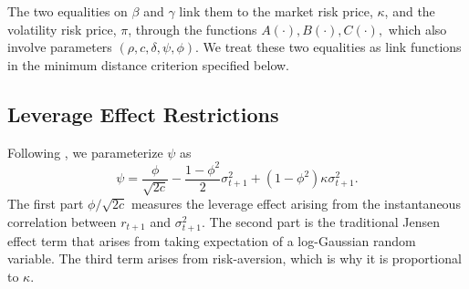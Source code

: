 \documentclass[11pt, letterpaper, twoside]{article}
\begin{document}
The two equalities on $\beta $ and $\gamma $ link them to the market risk price, $\kappa$, and the volatility risk price, $\pi$,  through the functions $A(\cdot),B(\cdot ),C(\cdot ),$ which also involve parameters $(\rho ,c,\delta ,\psi ,\phi ).$ We treat these two equalities as link functions in the minimum distance criterion specified below.

\subsection{Leverage Effect Restrictions}\label{sec:leverage effect restrict}



Following \textcite{han2018leverage}, we parameterize $\psi$ as 
%
\begin{equation}
    \label{eqn:leverage restriction}
    \psi = \frac{\phi}{\sqrt{2c}} - \frac{1 - \phi^2}{2} \sigma^2_{t+1} + (1-\phi^2) \kappa \sigma^2_{t+1}.
\end{equation}
%
The first part $\phi / \sqrt{2 c}$ measures the leverage effect arising from the instantaneous correlation between $r_{t+1}$ and $\sigma^2_{t+1}$. 
The second part is the traditional Jensen effect term that arises from taking expectation of a log-Gaussian random variable.  The third term arises from risk-aversion, which is why it is proportional to $\kappa$.
%
\end{document}
